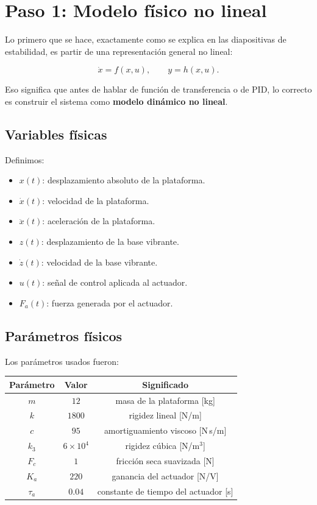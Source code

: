 \documentclass[11pt]{article}
\begin{document}
\section{Paso 1: Modelo f\'isico no lineal}

Lo primero que se hace, exactamente como se explica en las diapositivas de estabilidad, es partir de una representaci\'on general no lineal:

\begin{equation}
\dot{x}=f(x,u), \qquad y=h(x,u).
\end{equation}

Eso significa que antes de hablar de funci\'on de transferencia o de PID, lo correcto es construir el sistema como \textbf{modelo din\'amico no lineal}.

\subsection{Variables f\'isicas}

Definimos:

\begin{itemize}[leftmargin=1.2cm]
\item $x(t)$: desplazamiento absoluto de la plataforma.
\item $\dot{x}(t)$: velocidad de la plataforma.
\item $\ddot{x}(t)$: aceleraci\'on de la plataforma.
\item $z(t)$: desplazamiento de la base vibrante.
\item $\dot{z}(t)$: velocidad de la base vibrante.
\item $u(t)$: se\~nal de control aplicada al actuador.
\item $F_a(t)$: fuerza generada por el actuador.
\end{itemize}

\subsection{Par\'ametros f\'isicos}

Los par\'ametros usados fueron:

\begin{center}
\begin{tabular}{ccc}
\toprule
Par\'ametro & Valor & Significado \\
\midrule
$m$ & $12$ & masa de la plataforma [kg] \\
$k$ & $1800$ & rigidez lineal [N/m] \\
$c$ & $95$ & amortiguamiento viscoso [N\,s/m] \\
$k_3$ & $6\times 10^4$ & rigidez c\'ubica [N/m$^3$] \\
$F_c$ & $1$ & fricci\'on seca suavizada [N] \\
$K_a$ & $220$ & ganancia del actuador [N/V] \\
$\tau_a$ & $0.04$ & constante de tiempo del actuador [s] \\
\bottomrule
\end{tabular}
\end{center}
\end{document}
